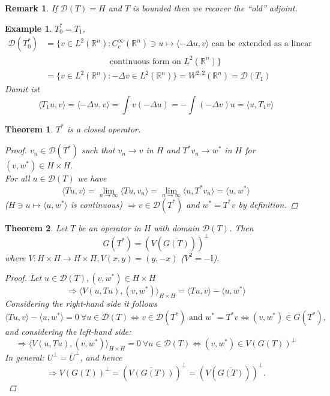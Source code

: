 \documentclass[12pt]{extreport} %
\newcommand{\R}{\mathbb{R}}
\newcommand{\DO}[1]{\mathcal{D}\left( {#1} \right)}
\theoremstyle{named}
\theoremstyle{nnamed}
\theoremstyle{itshape}
\newtheorem{theorem}{Theorem}  \counterwithin{theorem}{chapter}
\theoremstyle{normal}
\newtheorem*{example}{Example}
\newtheorem*{remark}{Remark}
\begin{document}
\begin{remark}
	If $\DO{T} = H$ and $T$ is bounded then we recover the \enquote{old} adjoint.
\end{remark}

\begin{example}
	$T_0^* = T_1$, 
	\begin{align*}
		\DO{T_0^*} & = \big\{ v \in L^2(\R^n) \colon C_c^\infty(\R^n) \ni u \mapsto \langle - \Delta u, v \rangle \text{ can be extended as a linear} \\
			& ~\hspace{3cm} \text{ continuous form on } L^2(\R^n) \big\} \\
			& = \big\{ v \in L^2(\R^n) \colon - \Delta v \in L^2(\R^n) \big\} = W^{2,2}(\R^n) = \DO{T_1}
	\end{align*}
	Damit ist
	$$ \langle T_1 u, v \rangle = \langle - \Delta u, v \rangle = \int v \left( - \Delta u \right) = - \int \left( - \Delta v \right) u = \langle u, T_1 v \rangle $$
\end{example}

\begin{theorem} \label{I.1:thm}
	$T^*$ is a closed operator.
	
	\begin{proof}
		$v_n \in \DO{T^*}$ such that $v_n \rightarrow v$ in $H$ and $T^* v_n \rightarrow w^*$ in $H$ for $(v, w^*) \in H \times H$. ~\\
		For all $u \in \DO{T}$ we have
			$$ \langle Tu, v \rangle = \lim_{n \rightarrow \infty} \langle T u, v_n \rangle = \lim_{n \rightarrow \infty} \langle u, T^* v_n \rangle = \langle u , w^* \rangle $$
		($H \ni u \mapsto \langle u, w^* \rangle$ is continuous) $\Rightarrow v \in \DO{T^*}$ and $w^* = T^* v$ by definition.
	\end{proof}
\end{theorem}

\begin{theorem} \label{I.2:thm}
	Let $T$ be an operator in $H$ with domain $\DO{T}$. Then
		$$ G \left( T^* \right) = \left( V \left( \overline{G(T)} \right) \right)^{\perp} $$
	where $V \colon H \times H \rightarrow H \times H, V(x, y) = (y, -x)$ ($V^2 = - \mathbb{I}$).
	
	\begin{proof}
		Let $u \in \DO{T}, \left(v, w^* \right) \in H \times H$ 
			$$ \Rightarrow \langle V \left( u, Tu \right), \left( v, w^* \right) \rangle_{H \times H} = \langle T u, v \rangle - \langle u, w^* \rangle $$
		Considering the right-hand side it follows
		$$ \langle T u, v \rangle - \langle u, w^* \rangle = 0 ~ \forall u \in \DO{T} \iff v \in \DO{T^*} \text{ and } w^* = T^* v \iff \left( v, w^* \right) \in G\left( T^* \right), $$
		and considering the left-hand side:
		$$ \Rightarrow \langle V \left( u, Tu \right), \left( v, w^* \right) \rangle_{H \times H} = 0 ~ \forall u \in \DO{T} \iff \left( v, w^* \right) \in V \left( G(T) \right)^{\perp} $$
		In general: $U^{\perp} = \overline{U}^{\perp}$, and hence
		$$ \Rightarrow V \left( G(T) \right)^{\perp} = \left( \overline{V\left( G(T) \right)} \right)^{\perp} = \left( V \left( \overline{G(T)} \right) \right)^{\perp}. $$
	\end{proof}
\end{theorem}
\end{document}
